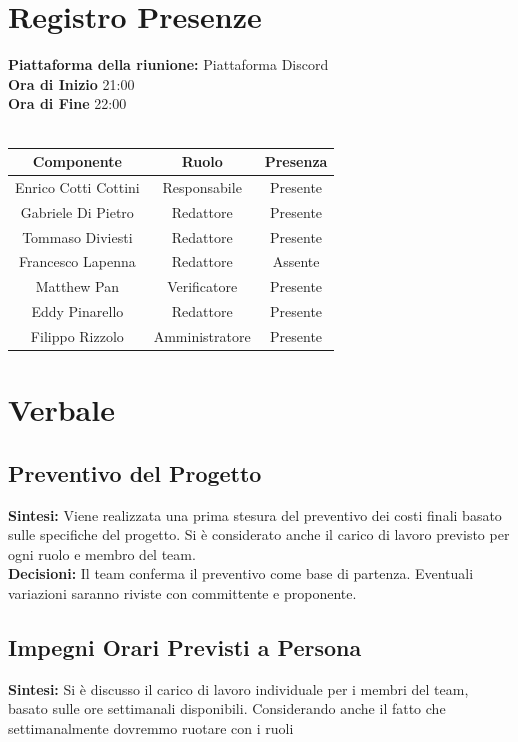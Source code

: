 \documentclass{article}
\begin{document}
\section{Registro Presenze}
\textbf{Piattaforma della riunione:} Piattaforma Discord \\
\textbf{Ora di Inizio} 21:00\\
\textbf{Ora di Fine} 22:00\\
\\
\begin{tabular}{|c|c|c|} %
    \hline
    \textbf{Componente} & \textbf{Ruolo} & \textbf{Presenza}\\
    \hline
    Enrico Cotti Cottini & Responsabile & Presente \\ 
    \hline
    Gabriele Di Pietro & Redattore & Presente\\ 
    \hline
    Tommaso Diviesti & Redattore & Presente \\ 
    \hline 
    Francesco Lapenna & Redattore& Assente \\ 
    \hline
    Matthew Pan & Verificatore & Presente\\ 
    \hline 
    Eddy Pinarello & Redattore & Presente \\ 
    \hline 
    Filippo Rizzolo & Amministratore& Presente \\ 
    \hline 
\end{tabular}

\newpage
\section{Verbale}
\subsection{Preventivo del Progetto}
\textbf{Sintesi:} Viene realizzata una prima stesura del preventivo dei costi finali basato sulle specifiche del progetto. Si è considerato anche il carico di lavoro previsto per ogni ruolo e membro del team. \\
\textbf{Decisioni:} Il team conferma il preventivo come base di partenza. Eventuali variazioni saranno riviste con committente e proponente.

\subsection{Impegni Orari Previsti a Persona}
\textbf{Sintesi:} Si è discusso il carico di lavoro individuale per i membri del team, basato sulle ore settimanali disponibili. Considerando anche il fatto che settimanalmente dovremmo ruotare con i ruoli
\end{document}
